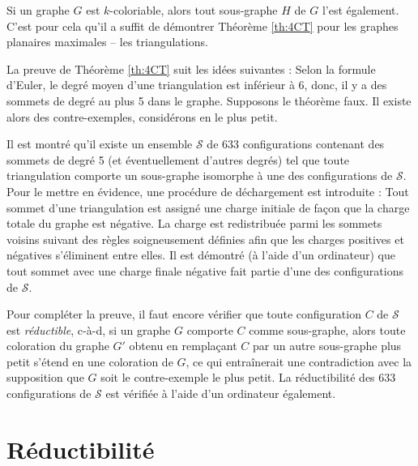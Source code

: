 \documentclass[10pt,a4paper]{article}
\newtheorem{proposition}{Proposition}
\begin{document}
Si un graphe $G$ est $k$-coloriable, alors tout sous-graphe $H$ de $G$ l'est également. C'est pour cela qu'il a suffit de démontrer Théorème \ref{th:4CT} pour les graphes planaires maximales -- les triangulations.




La preuve de Théorème \ref{th:4CT} suit les idées suivantes : Selon la formule d'Euler, le degré moyen d'une triangulation est inférieur à 6, donc, il y a des sommets de degré au plus 5 dans le graphe. Supposons le théorème faux. Il existe alors des contre-exemples, considérons en le plus petit. 

Il est montré qu'il existe un ensemble $\mathcal{S}$ de 633 configurations contenant des sommets de degré 5 (et éventuellement d'autres degrés) tel que toute triangulation comporte un sous-graphe isomorphe à une des configurations de $\mathcal{S}$. Pour le mettre en évidence, une procédure de déchargement est introduite : Tout sommet d'une triangulation est assigné une charge initiale de façon que la charge totale du graphe est négative. La charge est redistribuée parmi les sommets voisins suivant des règles soigneusement définies afin que les charges positives et négatives s'éliminent entre elles. Il est démontré (à l'aide d'un ordinateur) que tout sommet avec une charge finale négative fait partie d'une des configurations de $\mathcal{S}$.

Pour compléter la preuve, il faut encore vérifier que toute configuration $C$ de $\mathcal{S}$ est \emph{réductible}, c-à-d, si un graphe $G$ comporte $C$ comme sous-graphe, alors toute coloration du graphe $G'$ obtenu en remplaçant $C$ par un autre sous-graphe plus petit s'étend en une coloration de $G$, ce qui entraînerait une contradiction avec la supposition que $G$ soit le contre-exemple le plus petit.
La réductibilité des 633 configurations de $\mathcal{S}$ est vérifiée à l'aide d'un ordinateur également.

\newpage





\section{Réductibilité}
\end{document}
